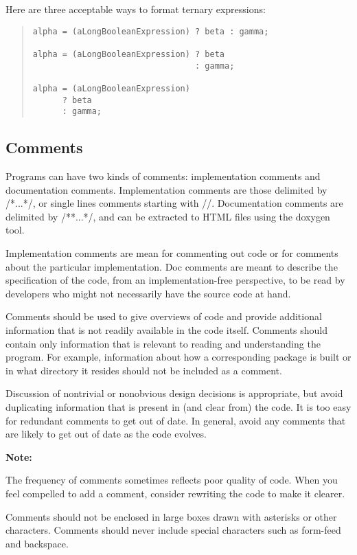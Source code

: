 \documentclass{article}
\begin{document}
Here are three acceptable ways to format ternary expressions:

\begin{quote}
\begin{verbatim}
alpha = (aLongBooleanExpression) ? beta : gamma;  

alpha = (aLongBooleanExpression) ? beta
                                 : gamma;  

alpha = (aLongBooleanExpression)
      ? beta 
      : gamma;  
\end{verbatim}
\end{quote}


\subsection{Comments}
\label{sec:cguide:comments}

Programs can have two kinds of comments: implementation comments
and documentation comments. Implementation comments are those 
delimited by /*...*/, or single lines comments starting with //. 
Documentation comments are delimited by
/**...*/, and can be extracted to HTML files using the
doxygen tool.

Implementation comments are mean for commenting out code or for
comments about the particular implementation. Doc comments are meant
to describe the specification of the code, from an implementation-free
perspective, to be read by developers who might not necessarily have
the source code at hand.

Comments should be used to give overviews of code and provide
additional information that is not readily available in the code
itself. Comments should contain only information that is relevant to
reading and understanding the program. For example, information about
how a corresponding package is built or in what directory it resides
should not be included as a comment.

Discussion of nontrivial or nonobvious design decisions is
appropriate, but avoid duplicating information that is present in (and
clear from) the code. It is too easy for redundant comments to get out
of date. In general, avoid any comments that are likely to get out of
date as the code evolves.

\textbf{Note:}

The frequency of comments sometimes reflects poor quality of
code. When you feel compelled to add a comment, consider rewriting the
code to make it clearer.

Comments should not be enclosed in large boxes drawn with asterisks or
other characters. Comments should never include special characters
such as form-feed and backspace.
\end{document}
